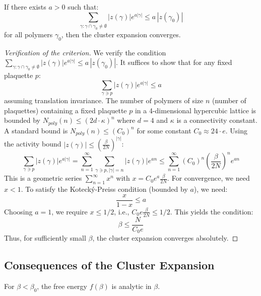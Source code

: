 \begin{theorem}
\label{thm:KP-criterion}
If there exists $a > 0$ such that:
\[
\sum_{\gamma : \gamma \cap \gamma_0 \neq \emptyset} |z(\gamma)| e^{a|\gamma|} \leq a \, |z(\gamma_0)|
\]
for all polymers $\gamma_0$, then the cluster expansion converges.
\end{theorem}

\begin{proof}[Verification of the criterion]
We verify the condition $\sum_{\gamma : \gamma \cap \gamma_0 \neq \emptyset} |z(\gamma)| e^{a|\gamma|} \leq a \, |z(\gamma_0)|$.
It suffices to show that for any fixed plaquette $p$:
\[
\sum_{\gamma \ni p} |z(\gamma)| e^{a|\gamma|} \leq a
\]
assuming translation invariance.
The number of polymers of size $n$ (number of plaquettes) containing a fixed plaquette $p$ in a 4-dimensional hypercubic lattice is bounded by $N_{poly}(n) \leq (2d \cdot \kappa)^n$ where $d=4$ and $\kappa$ is a connectivity constant. A standard bound is $N_{poly}(n) \leq (C_0)^n$ for some constant $C_0 \approx 24 \cdot e$.
Using the activity bound $|z(\gamma)| \leq (\frac{\beta}{2N})^{|\gamma|}$:
\[
\sum_{\gamma \ni p} |z(\gamma)| e^{a|\gamma|} = \sum_{n=1}^\infty \sum_{\gamma \ni p, |\gamma|=n} |z(\gamma)| e^{an} 
\leq \sum_{n=1}^\infty (C_0)^n \left(\frac{\beta}{2N}\right)^n e^{an}
\]
This is a geometric series $\sum_{n=1}^\infty x^n$ with $x = C_0 e^a \frac{\beta}{2N}$.
For convergence, we need $x < 1$. To satisfy the Kotecký-Preiss condition (bounded by $a$), we need:
\[
\frac{x}{1-x} \leq a
\]
Choosing $a=1$, we require $x \leq 1/2$, i.e., $C_0 e \frac{\beta}{2N} \leq 1/2$.
This yields the condition:
\[
\beta \leq \frac{N}{C_0 e}
\]
Thus, for sufficiently small $\beta$, the cluster expansion converges absolutely.
\end{proof}

\subsection{Consequences of the Cluster Expansion}

\begin{corollary}[Analyticity]
For $\beta < \beta_0$, the free energy $f(\beta)$ is analytic in $\beta$.
\end{corollary}


